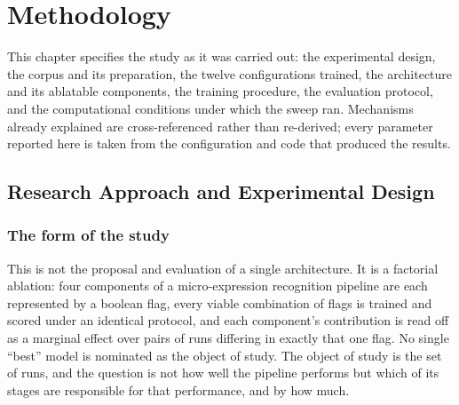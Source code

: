%
%

\chapter{Methodology}
\label{ch:methodology}

This chapter specifies the study as it was carried out: the experimental design, the corpus and its preparation, the twelve configurations trained, the architecture and its ablatable components, the training procedure, the evaluation protocol, and the computational conditions under which the sweep ran. Mechanisms already explained are cross-referenced rather than re-derived; every parameter reported here is taken from the configuration and code that produced the results.


\section{Research Approach and Experimental Design}
\label{sec:research-approach}

\subsection{The form of the study}
\label{sec:study-form}

This is not the proposal and evaluation of a single architecture. It is a factorial ablation: four components of a micro-expression recognition pipeline are each represented by a boolean flag, every viable combination of flags is trained and scored under an identical protocol, and each component's contribution is read off as a marginal effect over pairs of runs differing in exactly that one flag. No single ``best'' model is nominated as the object of study. The object of study is the set of runs, and the question is not how well the pipeline performs but which of its stages are responsible for that performance, and by how much.

